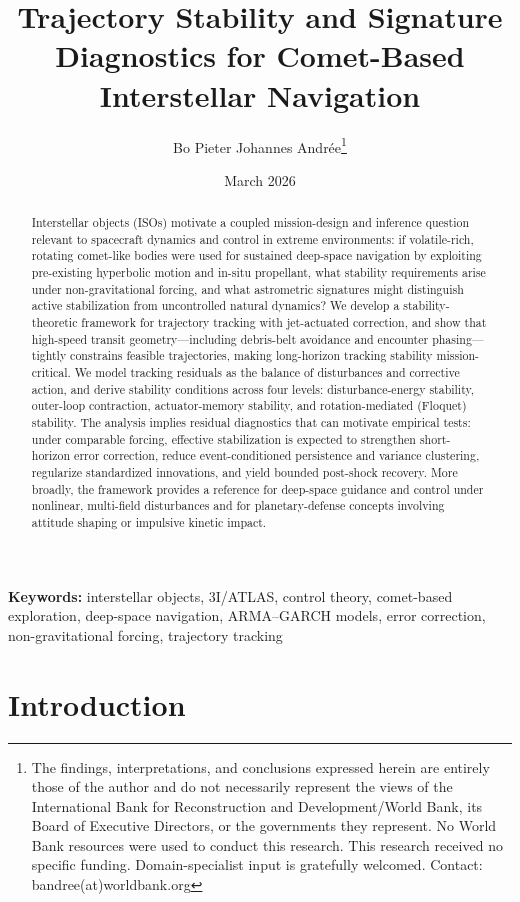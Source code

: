 \documentclass{article}
\title{Trajectory Stability and Signature Diagnostics for Comet-Based Interstellar Navigation}
\author[1]{Bo Pieter Johannes Andr\'ee\thanks{The findings, interpretations, and conclusions expressed herein are entirely those of the author and do not necessarily represent the views of the International Bank for Reconstruction and Development/World Bank, its Board of Executive Directors, or the governments they represent. No World Bank resources were used to conduct this research. This research received no specific funding. Domain-specialist input is gratefully welcomed. Contact: bandree(at)worldbank.org}}
\affil[1]{Data Group and Multilateral \& UN, World Bank, Geneva, Switzerland.}
\date{March 2026}
\begin{document}
\maketitle

\begin{abstract}
Interstellar objects (ISOs) motivate a coupled mission-design and inference question relevant to spacecraft dynamics and control in extreme environments: if volatile-rich, rotating comet-like bodies were used for sustained deep-space navigation by exploiting pre-existing hyperbolic motion and in-situ propellant, what stability requirements arise under non-gravitational forcing, and what astrometric signatures might distinguish active stabilization from uncontrolled natural dynamics? We develop a stability-theoretic framework for trajectory tracking with jet-actuated correction, and show that high-speed transit geometry---including debris-belt avoidance and encounter phasing---tightly constrains feasible trajectories, making long-horizon tracking stability mission-critical. We model tracking residuals as the balance of disturbances and corrective action, and derive stability conditions across four levels: disturbance-energy stability, outer-loop contraction, actuator-memory stability, and rotation-mediated (Floquet) stability. The analysis implies residual diagnostics that can motivate empirical tests: under comparable forcing, effective stabilization is expected to strengthen short-horizon error correction, reduce event-conditioned persistence and variance clustering, regularize standardized innovations, and yield bounded post-shock recovery. More broadly, the framework provides a reference for deep-space guidance and control under nonlinear, multi-field disturbances and for planetary-defense concepts involving attitude shaping or impulsive kinetic impact.
\end{abstract}

\medskip
\noindent
\textbf{Keywords:} interstellar objects, 3I/ATLAS, control theory, comet-based exploration, deep-space navigation, ARMA--GARCH models, error correction, non-gravitational forcing, trajectory tracking

\pagebreak


\section{Introduction}
\label{sec:intro}
\end{document}
